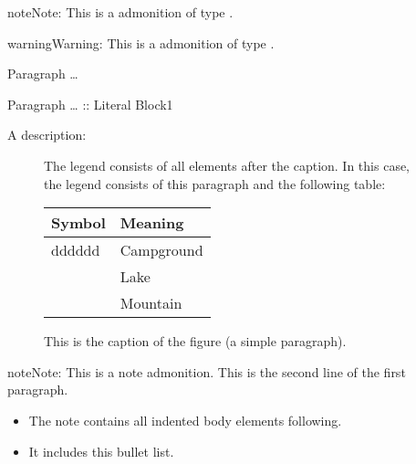 \documentclass[letterpaper,10pt,english]{sphinxmanual}
\begin{document}
\begin{sphinxadmonition}{note}{Note:}
This is a admonition of type .
\end{sphinxadmonition}

\begin{sphinxadmonition}{warning}{Warning:}
This is a admonition of type .
\end{sphinxadmonition}

\begin{figure}[htbp]
\centering

\noindent{}
\end{figure}

Paragraph …

\begin{sphinxVerbatim}[commandchars=\\\{\}]
 
\end{sphinxVerbatim}

Paragraph … :: Literal Block1

A description:

\begin{figure}[htbp]
\centering
\capstart

\noindent{}
\caption{This is the caption of the figure (a simple paragraph).}\label{\detokenize{in_file:id3}}
\begin{sphinxlegend}
The legend consists of all elements after the caption.  In this
case, the legend consists of this paragraph and the following
table:


\begin{savenotes}\sphinxattablestart
\centering
\begin{tabulary}{\linewidth}[t]{|T|T|}
\hline
\sphinxstyletheadfamily 
Symbol
&\sphinxstyletheadfamily 
Meaning
\\
\hline
dddddd
&
Campground
\\
\hline
\noindent{}
&
Lake
\\
\hline
\noindent{}
&
Mountain
\\
\hline
\end{tabulary}
\par
\sphinxattableend\end{savenotes}
\end{sphinxlegend}
\end{figure}

\begin{sphinxadmonition}{note}{Note:}
This is a note admonition.
This is the second line of the first paragraph.
\begin{itemize}
\item {} 
The note contains all indented body elements
following.

\item {} 
It includes this bullet list.

\end{itemize}
\end{sphinxadmonition}
\end{document}
